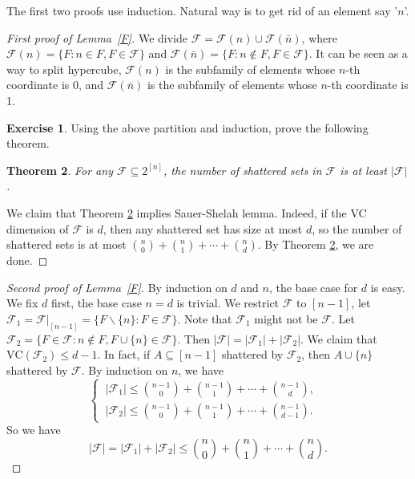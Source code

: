 \documentclass{article}
\newtheorem{theorem}{Theorem}[section]
\theoremstyle{definition}
\newtheorem{exercise}[theorem]{Exercise}
\newcommand{\VC}{\mathrm{VC}}
\begin{document}
The first two proofs use induction. Natural way is to get rid of an element say '$n$'.

\begin{proof}[First proof of Lemma~\ref{F}]
We divide $\mathcal{F}=\mathcal{F}(n)\cup \mathcal{F}(\bar{n})$, where $\mathcal{F}(n)=\{F : n\in F, F\in \mathcal{F}\}$ and $\mathcal{F}(\bar{n})=\{F : n\notin F, F\in \mathcal{F}\}$. It can be seen as a way to split hypercube, $\mathcal{F}(n)$ is the subfamily of elements whose $n$-th coordinate is 0, and $\mathcal{F}(\bar{n})$ is the subfamily of elements whose $n$-th coordinate is 1.

 \begin{exercise}
    Using the above partition and induction, prove the following theorem.
\end{exercise}
\begin{theorem}\label{thm20.13}
    For any $\mathcal{F}\subseteq 2^{[n]}$, the number of shattered sets in $\mathcal{F}$ is at least $|\mathcal{F}|$.
\end{theorem}
We claim that Theorem \ref{thm20.13} implies Sauer-Shelah lemma. Indeed, if the VC dimension of $\mathcal{F}$ is $d$, then any shattered set has size at most $d$, so the number of shattered sets is at most $\binom{n}{0}+\binom{n}{1}+\cdots+\binom{n}{d}$. By Theorem \ref{thm20.13}, we are done.
\end{proof}

\begin{proof}[Second proof of Lemma~\ref{F}]
    By induction on $d$ and $n$, the base case for $d$ is easy. We fix $d$ first, the base case $n=d$ is trivial. We restrict $\mathcal{F}$ to $[n-1]$, let $\mathcal{F}_{1}=\mathcal{F}|_{[n-1]}=\{ F\backslash \{ n \} :F\in \mathcal{F} \}$. Note that $\mathcal{F}_{1}$ might not be $\mathcal{F}$. Let $\mathcal{F}_{2}=\{ F\in \mathcal{F}: n\notin F, F\cup\{ n \} \in \mathcal{F} \}$. Then $|\mathcal{F}|=|\mathcal{F}_{1}|+|\mathcal{F}_{2}|$. We claim that $\VC(\mathcal{F}_{2})\leq d-1$. In fact, if $A\subseteq [n-1]$ shattered by $\mathcal{F}_{2}$, then $A\cup \{ n \}$ shattered by $\mathcal{F}$. By induction on $n$, we have
    \begin{equation*}
    \left\{
    \begin{aligned}
         \ |\mathcal{F}_{1}|\leq \binom{n-1}{0}+\binom{n-1}{1}+\cdots+\binom{n-1}{d}, &  \\
         \ |\mathcal{F}_{2}|\leq \binom{n-1}{0}+\binom{n-1}{1}+\cdots+\binom{n-1}{d-1}. & 
    \end{aligned}
    \right.
    \end{equation*}
    So we have
    $$|\mathcal{F}|=|\mathcal{F}_{1}|+|\mathcal{F}_{2}|\leq \binom{n}{0}+\binom{n}{1}+\cdots+\binom{n}{d}.$$
\end{proof}
\end{document}
